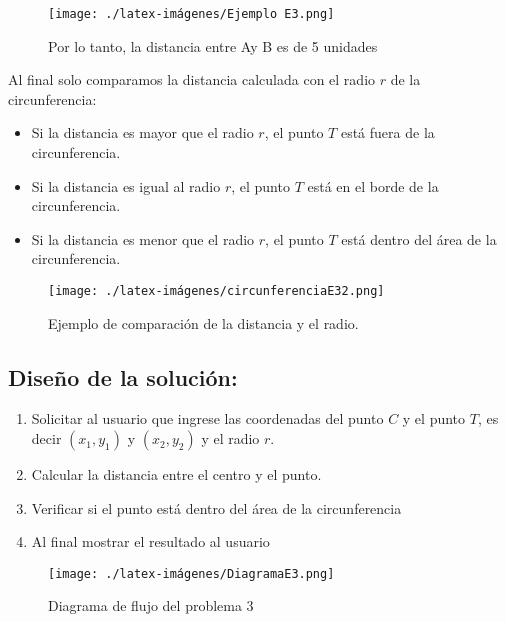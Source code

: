 \begin{figure}[h!]
    \centering
    \texttt{[image: ./latex-imágenes/Ejemplo E3.png]}
    \caption{Por lo tanto, la distancia entre Ay B es de 5 unidades}
    \label{fig:Ejemplo}
\end{figure}


Al final solo comparamos la distancia calculada con el radio $r$ de la circunferencia:

\begin{itemize}
\renewcommand\labelitemi{--}
\item Si la distancia es mayor que el radio $r$, el punto $T$ está fuera de la circunferencia.
\item Si la distancia es igual al radio $r$, el punto $T$ está en el borde de la circunferencia.
\item Si la distancia es menor que el radio $r$, el punto $T$ está dentro del área de la circunferencia.\\    
\end{itemize}

\begin{figure}[h!]
    \centering
    \texttt{[image: ./latex-imágenes/circunferenciaE32.png]}
    \caption{Ejemplo de comparación de la distancia y el radio.}
    \label{fig:uno}
\end{figure}


\subsection{\textbf{Diseño de la solución:}}

\begin{enumerate}
\item Solicitar al usuario que ingrese las coordenadas del punto $C$ y el punto $T$, es decir $(x_{1}, y_{1})$ y $(x_{2}, y_{2})$ y el radio $r$.
\item Calcular la distancia entre el centro y el punto.
\item Verificar si el punto está dentro del área de la circunferencia
\item Al final mostrar el resultado al usuario \\
\end{enumerate}

\begin{figure}[h!]
    \centering
    \texttt{[image: ./latex-imágenes/DiagramaE3.png]}
    \caption{Diagrama de flujo del problema 3}
    \label{fig:DiagrmadeFlujo}
\end{figure}


